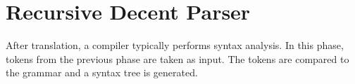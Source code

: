 \documentclass[thesis]{hmcposter}
\begin{document}
\begin{poster}
\begin{figure}
\begin{center}
\hspace{0.4in}
\end{center}
\end{figure}

\columnbreak

\section{Recursive Decent Parser}
After translation, a compiler typically performs syntax analysis. In this phase, tokens from the previous phase are taken as input. The tokens are compared to the grammar and a syntax tree is generated. 

\vspace{0.5in}


\end{poster}
\end{document}
